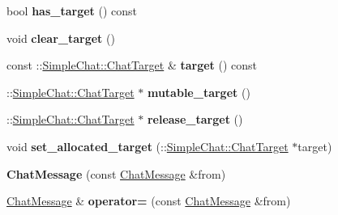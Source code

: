 \begin{DoxyCompactItemize}
\item 
\hypertarget{classSimpleChat_1_1ChatMessage_a704f255c6091ba78db772cf78fde0c29}{bool {\bfseries has\-\_\-target} () const }\label{classSimpleChat_1_1ChatMessage_a704f255c6091ba78db772cf78fde0c29}

\item 
\hypertarget{classSimpleChat_1_1ChatMessage_a144663c85b22b0f79a079c0c575ce96f}{void {\bfseries clear\-\_\-target} ()}\label{classSimpleChat_1_1ChatMessage_a144663c85b22b0f79a079c0c575ce96f}

\item 
\hypertarget{classSimpleChat_1_1ChatMessage_a78c3116e0523179d5118ad7779df428b}{const \-::\hyperlink{classSimpleChat_1_1ChatTarget}{Simple\-Chat\-::\-Chat\-Target} \& {\bfseries target} () const }\label{classSimpleChat_1_1ChatMessage_a78c3116e0523179d5118ad7779df428b}

\item 
\hypertarget{classSimpleChat_1_1ChatMessage_a0f912be120023583235c0c6ae7e0e660}{\-::\hyperlink{classSimpleChat_1_1ChatTarget}{Simple\-Chat\-::\-Chat\-Target} $\ast$ {\bfseries mutable\-\_\-target} ()}\label{classSimpleChat_1_1ChatMessage_a0f912be120023583235c0c6ae7e0e660}

\item 
\hypertarget{classSimpleChat_1_1ChatMessage_a5de53b4a708a5a58772c58f46c9c9bd2}{\-::\hyperlink{classSimpleChat_1_1ChatTarget}{Simple\-Chat\-::\-Chat\-Target} $\ast$ {\bfseries release\-\_\-target} ()}\label{classSimpleChat_1_1ChatMessage_a5de53b4a708a5a58772c58f46c9c9bd2}

\item 
\hypertarget{classSimpleChat_1_1ChatMessage_a7c2bfae57846308a1a553b70b558ce99}{void {\bfseries set\-\_\-allocated\-\_\-target} (\-::\hyperlink{classSimpleChat_1_1ChatTarget}{Simple\-Chat\-::\-Chat\-Target} $\ast$target)}\label{classSimpleChat_1_1ChatMessage_a7c2bfae57846308a1a553b70b558ce99}

\item 
\hypertarget{classSimpleChat_1_1ChatMessage_a231f5e8f74e136753ca49ea5ca9ae51f}{{\bfseries Chat\-Message} (const \hyperlink{classSimpleChat_1_1ChatMessage}{Chat\-Message} \&from)}\label{classSimpleChat_1_1ChatMessage_a231f5e8f74e136753ca49ea5ca9ae51f}

\item 
\hypertarget{classSimpleChat_1_1ChatMessage_ade94e82145002b81dfa9e2f35855084f}{\hyperlink{classSimpleChat_1_1ChatMessage}{Chat\-Message} \& {\bfseries operator=} (const \hyperlink{classSimpleChat_1_1ChatMessage}{Chat\-Message} \&from)}\label{classSimpleChat_1_1ChatMessage_ade94e82145002b81dfa9e2f35855084f}


\end{DoxyCompactItemize}
